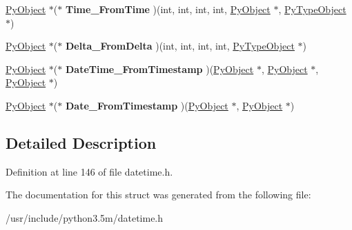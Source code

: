 \begin{DoxyCompactItemize}
\item 
\hyperlink{struct__object}{Py\+Object} $\ast$($\ast$ {\bfseries Time\+\_\+\+From\+Time} )(int, int, int, int, \hyperlink{struct__object}{Py\+Object} $\ast$, \hyperlink{struct__typeobject}{Py\+Type\+Object} $\ast$)\hypertarget{structPyDateTime__CAPI_a7ab28a3df6cf8503f49553d40a4bdb08}{}\label{structPyDateTime__CAPI_a7ab28a3df6cf8503f49553d40a4bdb08}

\item 
\hyperlink{struct__object}{Py\+Object} $\ast$($\ast$ {\bfseries Delta\+\_\+\+From\+Delta} )(int, int, int, int, \hyperlink{struct__typeobject}{Py\+Type\+Object} $\ast$)\hypertarget{structPyDateTime__CAPI_aeac28563c38854bbb88403ec237cf46a}{}\label{structPyDateTime__CAPI_aeac28563c38854bbb88403ec237cf46a}

\item 
\hyperlink{struct__object}{Py\+Object} $\ast$($\ast$ {\bfseries Date\+Time\+\_\+\+From\+Timestamp} )(\hyperlink{struct__object}{Py\+Object} $\ast$, \hyperlink{struct__object}{Py\+Object} $\ast$, \hyperlink{struct__object}{Py\+Object} $\ast$)\hypertarget{structPyDateTime__CAPI_af647a82aacdc468e9a5036a35f7e43eb}{}\label{structPyDateTime__CAPI_af647a82aacdc468e9a5036a35f7e43eb}

\item 
\hyperlink{struct__object}{Py\+Object} $\ast$($\ast$ {\bfseries Date\+\_\+\+From\+Timestamp} )(\hyperlink{struct__object}{Py\+Object} $\ast$, \hyperlink{struct__object}{Py\+Object} $\ast$)\hypertarget{structPyDateTime__CAPI_a5f2e838aedbb4a18c649736ba252613b}{}\label{structPyDateTime__CAPI_a5f2e838aedbb4a18c649736ba252613b}

\end{DoxyCompactItemize}


\subsection{Detailed Description}


Definition at line 146 of file datetime.\+h.



The documentation for this struct was generated from the following file\+:\begin{DoxyCompactItemize}
\item 
/usr/include/python3.\+5m/datetime.\+h\end{DoxyCompactItemize}
